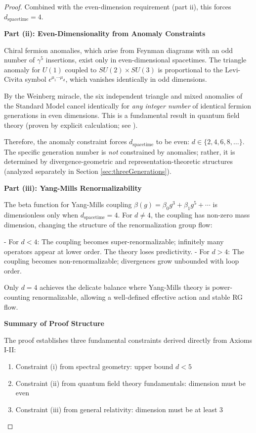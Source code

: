 \begin{lemma}
\begin{proof}
Combined with the even-dimension requirement (part ii), this forces $d_{\text{spacetime}} = 4$.

\textbf{Part (ii): Even-Dimensionality from Anomaly Constraints}

Chiral fermion anomalies, which arise from Feynman diagrams with an odd number of $\gamma^5$ insertions, exist only in even-dimensional spacetimes. The triangle anomaly for $U(1)$ coupled to $SU(2) \times SU(3)$ is proportional to the Levi-Civita symbol $\epsilon^{\mu_1 \cdots \mu_d}$, which vanishes identically in odd dimensions.

By the Weinberg miracle, the six independent triangle and mixed anomalies of the Standard Model cancel identically for \emph{any integer number} of identical fermion generations in even dimensions. This is a fundamental result in quantum field theory (proven by explicit calculation; see \cite{Weinberg1972gravitational}).

Therefore, the anomaly constraint forces $d_{\mathrm{spacetime}}$ to be even: $d \in \{2, 4, 6, 8, \ldots\}$. The specific generation number is \emph{not} constrained by anomalies; rather, it is determined by divergence-geometric and representation-theoretic structures (analyzed separately in Section \ref{sec:threeGenerations}).

\textbf{Part (iii): Yang-Mills Renormalizability}

The beta function for Yang-Mills coupling $\beta(g) = \beta_0 g^3 + \beta_1 g^5 + \cdots$ is dimensionless only when $d_{\mathrm{spacetime}} = 4$. For $d \neq 4$, the coupling has non-zero mass dimension, changing the structure of the renormalization group flow:

- For $d < 4$: The coupling becomes super-renormalizable; infinitely many operators appear at lower order. The theory loses predictivity.
- For $d > 4$: The coupling becomes non-renormalizable; divergences grow unbounded with loop order.

Only $d = 4$ achieves the delicate balance where Yang-Mills theory is power-counting renormalizable, allowing a well-defined effective action and stable RG flow.

\textbf{Summary of Proof Structure}

The proof establishes three fundamental constraints derived directly from Axioms I-II:
\begin{enumerate}
\item Constraint (i) from spectral geometry: upper bound $d < 5$
\item Constraint (ii) from quantum field theory fundamentals: dimension must be even
\item Constraint (iii) from general relativity: dimension must be at least 3
\end{enumerate}


\end{proof}
\end{lemma}
